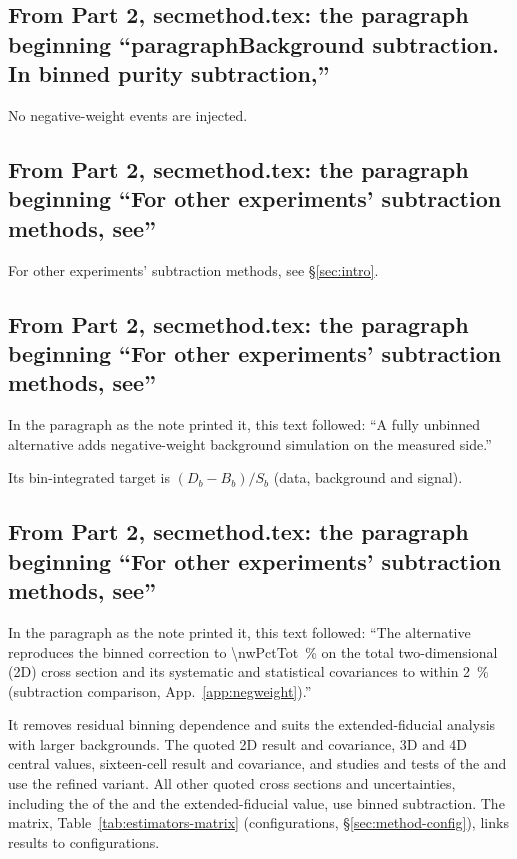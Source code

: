 \subsection{From Part 2, secmethod.tex: the paragraph beginning ``paragraphBackground subtraction. In binned purity subtraction,''}
No negative-weight events are injected.

\subsection{From Part 2, secmethod.tex: the paragraph beginning ``For other experiments' subtraction methods, see''}
For other experiments' subtraction methods, see \S\ref{sec:intro}.

\subsection{From Part 2, secmethod.tex: the paragraph beginning ``For other experiments' subtraction methods, see''}
In the paragraph as the note printed it, this text followed: ``A fully unbinned alternative adds negative-weight background simulation on the measured side.''\par
Its bin-integrated target is $(D_{b}-B_{b})/S_{b}$ (data, background and signal).

\subsection{From Part 2, secmethod.tex: the paragraph beginning ``For other experiments' subtraction methods, see''}
In the paragraph as the note printed it, this text followed: ``The alternative reproduces the binned correction to \SI{\nwPctTot}{\percent} on the total two-dimensional (2D) cross section and its systematic and statistical covariances to within \SI{2}{\percent} (subtraction comparison, App.~\ref{app:negweight}).''\par
It removes residual binning dependence and suits the extended-fiducial analysis with larger backgrounds. The quoted 2D result and covariance, 3D and 4D central values, sixteen-cell result and covariance, and studies and tests of the \estLowCap{} and \estMultiD{} use the refined variant. All other quoted cross sections and uncertainties, including the \resFiveAxis{} of the \estPurity{} and the extended-fiducial value, use binned subtraction. The matrix, Table~\ref{tab:estimators-matrix} (configurations, \S\ref{sec:method-config}), links results to configurations.

